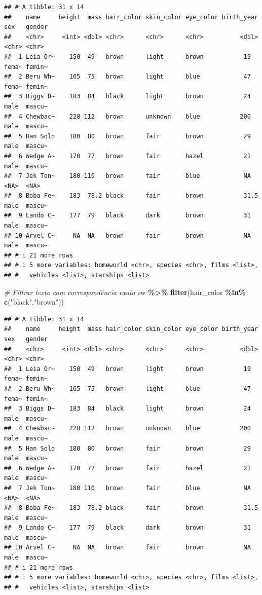 \documentclass[
]{book}
\newenvironment{Shaded}{\begin{snugshade}}{\end{snugshade}}
\newcommand{\CommentTok}[1]{\textcolor[rgb]{0.56,0.35,0.01}{\textit{#1}}}
\newcommand{\FunctionTok}[1]{\textcolor[rgb]{0.13,0.29,0.53}{\textbf{#1}}}
\newcommand{\NormalTok}[1]{#1}
\newcommand{\SpecialCharTok}[1]{\textcolor[rgb]{0.81,0.36,0.00}{\textbf{#1}}}
\newcommand{\StringTok}[1]{\textcolor[rgb]{0.31,0.60,0.02}{#1}}
\begin{document}
\begin{verbatim}
## # A tibble: 31 x 14
##    name     height  mass hair_color skin_color eye_color birth_year sex   gender
##    <chr>     <int> <dbl> <chr>      <chr>      <chr>          <dbl> <chr> <chr> 
##  1 Leia Or~    150  49   brown      light      brown           19   fema~ femin~
##  2 Beru Wh~    165  75   brown      light      blue            47   fema~ femin~
##  3 Biggs D~    183  84   black      light      brown           24   male  mascu~
##  4 Chewbac~    228 112   brown      unknown    blue           200   male  mascu~
##  5 Han Solo    180  80   brown      fair       brown           29   male  mascu~
##  6 Wedge A~    170  77   brown      fair       hazel           21   male  mascu~
##  7 Jek Ton~    180 110   brown      fair       blue            NA   <NA>  <NA>  
##  8 Boba Fe~    183  78.2 black      fair       brown           31.5 male  mascu~
##  9 Lando C~    177  79   black      dark       brown           31   male  mascu~
## 10 Arvel C~     NA  NA   brown      fair       brown           NA   male  mascu~
## # i 21 more rows
## # i 5 more variables: homeworld <chr>, species <chr>, films <list>,
## #   vehicles <list>, starships <list>
\end{verbatim}

\begin{Shaded}
\begin{Highlighting}[]
\CommentTok{\# Filtrar texto com correspondência exata}
\NormalTok{sw }\SpecialCharTok{\%\textgreater{}\%} \FunctionTok{filter}\NormalTok{(hair\_color }\SpecialCharTok{\%in\%} \FunctionTok{c}\NormalTok{(}\StringTok{"black"}\NormalTok{,}\StringTok{"brown"}\NormalTok{))}
\end{Highlighting}
\end{Shaded}

\begin{verbatim}
## # A tibble: 31 x 14
##    name     height  mass hair_color skin_color eye_color birth_year sex   gender
##    <chr>     <int> <dbl> <chr>      <chr>      <chr>          <dbl> <chr> <chr> 
##  1 Leia Or~    150  49   brown      light      brown           19   fema~ femin~
##  2 Beru Wh~    165  75   brown      light      blue            47   fema~ femin~
##  3 Biggs D~    183  84   black      light      brown           24   male  mascu~
##  4 Chewbac~    228 112   brown      unknown    blue           200   male  mascu~
##  5 Han Solo    180  80   brown      fair       brown           29   male  mascu~
##  6 Wedge A~    170  77   brown      fair       hazel           21   male  mascu~
##  7 Jek Ton~    180 110   brown      fair       blue            NA   <NA>  <NA>  
##  8 Boba Fe~    183  78.2 black      fair       brown           31.5 male  mascu~
##  9 Lando C~    177  79   black      dark       brown           31   male  mascu~
## 10 Arvel C~     NA  NA   brown      fair       brown           NA   male  mascu~
## # i 21 more rows
## # i 5 more variables: homeworld <chr>, species <chr>, films <list>,
## #   vehicles <list>, starships <list>
\end{verbatim}
\end{document}
